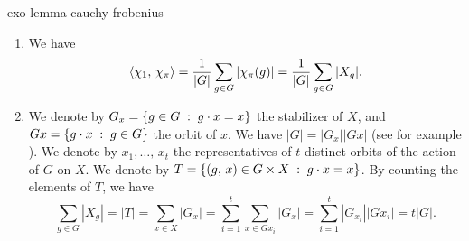  
\begin{correction}{exo-lemma-cauchy-frobenius}
\begin{enumerate}
\item We have
\begin{equation*}
\langle \chi_1,\,\chi_\pi\rangle = \frac{1}{|G|} \sum_{g \in G}{| \chi_\pi (g) |} = \frac{1}{|G|} \sum_{g \in G}{| X_g |}.
\end{equation*}
 
\item We denote by $ G_x = \left\{ g \in G \;:\; g \cdot x = x \right\} $ the stabilizer of $ X $, and $ G x = \left\{ g \cdot x \;:\; g \in G \right\} $ the orbit of $ x $. We have $ |G| = | G_x | | G x | $ (see for example \cite{perrin}). We denote by $ x_1, \ldots, \, x_t $ the representatives of $ t $ distinct orbits of the action of $ G $ on $ X $. We denote by $ T = \left\{ (g, \, x) \in G \times X \;:\; g \cdot x = x \right\} $. By counting  the elements of $ T $, we have
\begin{equation*}
\sum_{g \in G}{| X_g |} = | T | = \sum_{x \in X}{| G_x |} = \sum_{i = 1}^t{\sum_{x \in G x_i}{| G_{x} |}} = \sum_{i = 1}^t{| G_{x_i} | | G x_i |} = t |G|.
\end{equation*}
 

\end{enumerate}
\end{correction}
